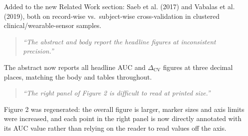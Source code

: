 \documentclass[11pt]{article}
\newcommand{\DeltaCV}{\Delta_{\text{CV}}}
\newcommand{\rc}[1]{\textit{``#1''}}
\newenvironment{response}{\begin{quote}\color{black}}{\end{quote}}
\begin{document}
Added to the new Related Work section: Saeb et al. (2017) and Vabalas et al. (2019), both on record-wise vs.\ subject-wise cross-validation in clustered clinical/wearable-sensor samples.

\begin{response}
\rc{The abstract and body report the headline figures at inconsistent precision.}
\end{response}

The abstract now reports all headline AUC and $\DeltaCV$ figures at three decimal places, matching the body and tables throughout.

\begin{response}
\rc{The right panel of Figure 2 is difficult to read at printed size.}
\end{response}

Figure 2 was regenerated: the overall figure is larger, marker sizes and axis limits were increased, and each point in the right panel is now directly annotated with its AUC value rather than relying on the reader to read values off the axis.
\end{document}
